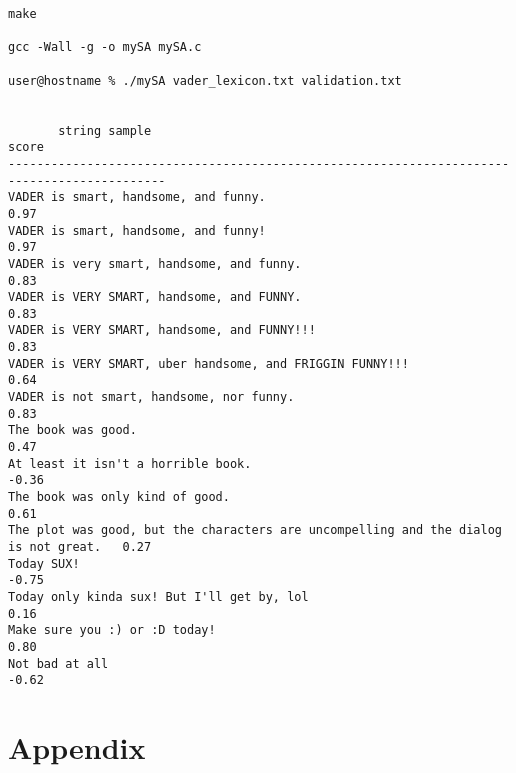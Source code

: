\documentclass[a4paper]{article}
\begin{document}
\begin{verbatim}
make

gcc -Wall -g -o mySA mySA.c

user@hostname % ./mySA vader_lexicon.txt validation.txt


       string sample                                                                  score
--------------------------------------------------------------------------------------------
VADER is smart, handsome, and funny.                                                  0.97
VADER is smart, handsome, and funny!                                                  0.97
VADER is very smart, handsome, and funny.                                             0.83
VADER is VERY SMART, handsome, and FUNNY.                                             0.83
VADER is VERY SMART, handsome, and FUNNY!!!                                           0.83
VADER is VERY SMART, uber handsome, and FRIGGIN FUNNY!!!                              0.64
VADER is not smart, handsome, nor funny.                                              0.83
The book was good.                                                                    0.47
At least it isn't a horrible book.                                                    -0.36
The book was only kind of good.                                                       0.61
The plot was good, but the characters are uncompelling and the dialog is not great.   0.27
Today SUX!                                                                            -0.75
Today only kinda sux! But I'll get by, lol                                            0.16
Make sure you :) or :D today!                                                         0.80
Not bad at all                                                                        -0.62
\end{verbatim}

\section{Appendix}




\end{document}
